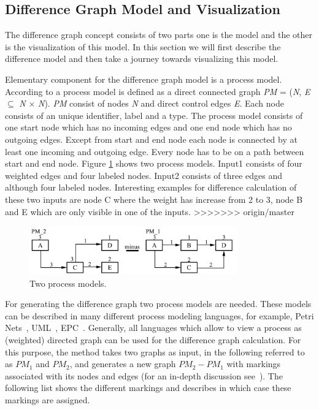 \documentclass{llncs}
\begin{document}
\begin{keywords}
\section{Difference Graph Model and Visualization} %
\label{sec:DiffgraphModel}
The difference graph concept \cite{lit:VisuApprDiffAnalysis} consists of two parts one is the model and the other is the visualization of this model. In this section we will  first describe the difference model and then take a journey towards visualizing this model.

Elementary component for the difference graph model is a process model. According to \cite{lit:VisuApprDiffAnalysis} a process model is defined as a direct connected graph \textit{PM} = (\textit{N}, \textit{E} $\subseteq$ \textit{N} $\times$ \textit{N}). \textit{PM} consist of nodes \textit{N} and direct control edges \textit{E}. Each node consists of an unique identifier, label and a type.
The process model consists of one start node which has no incoming edges and one end node which has no outgoing edges. Except from start and end node each node is connected by at least one incoming and outgoing edge. Every node has to be on a path between start and end node. Figure \ref{fig:ProcessModels} shows two process models. Input1 consists of four weighted edges and four labeled nodes. Input2 consists of three edges and although four labeled nodes. Interesting examples for difference calculation of these two inputs are node C where the weight has increase from 2 to 3, node B and E which are only visible in one of the inputs.
>>>>>>> origin/master

\begin{figure}
	\centering
	\includegraphics[width=0.8\textwidth]{Images/ProcessModels.PNG}
	\caption{Two process models.}
	\label{fig:ProcessModels}
\end{figure}

For generating the difference graph two process models are needed. These models can be described in many different process modeling languages, for example, Petri Nets~\cite{lit:Petrinet}, UML~\cite{lit:UML}, EPC~\cite{lit:EPC}. Generally, all languages which allow to view a process as (weighted) directed graph can be used for the difference graph calculation. For this purpose, the method takes two graphs as input, in the following referred to as $PM_1$ and $PM_2$, and generates a new graph $PM_2 - PM_1$ with markings associated with its nodes and edges (for an in-depth discussion see~\cite{lit:VisuApprDiffAnalysis}). The following list shows the different markings and describes in which case these markings are assigned.


\end{keywords}
\end{document}
